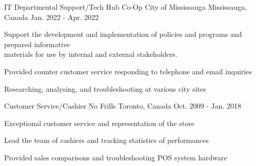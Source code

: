 \begin{cventries}
  \cventry
    {IT Departmental Support/Tech Hub Co-Op}
    {City of Mississauga}
    {Mississauga, Canada}
    {Jan. 2022 - Apr. 2022}
    {
      \begin{cvitems}
        \item {Support the development and implementation of policies and programs and prepared informative \\materials for use by internal and external stakeholders.}
        \item {Provided counter customer service responding to telephone and email inquiries}
        \item {Researching, analysing, and troubleshooting at various city sites}
      \end{cvitems}
    }
  \cventry
    {Customer Service/Cashier}
    {No Frills}
    {Toronto, Canada}
    {Oct. 2009 - Jan. 2018}
    {
      \begin{cvitems}
        \item {Exceptional customer service and representation of the store}
        \item {Lead the team of cashiers and tracking statistics of performances}
        \item {Provided sales comparisons and troubleshooting POS system hardware}
      \end{cvitems}
    }
\end{cventries}